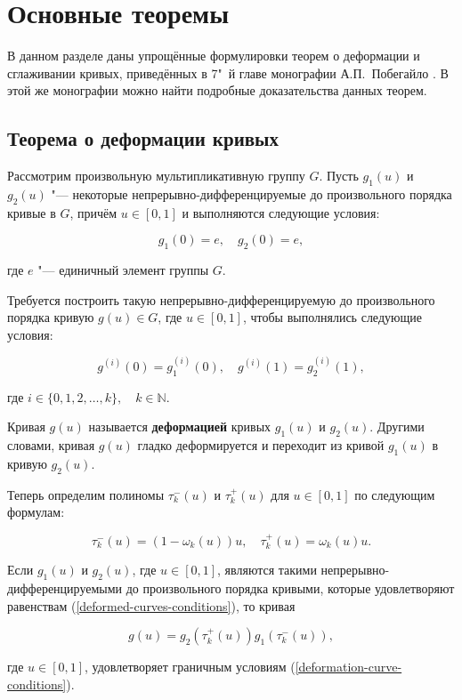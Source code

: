 \section{Основные теоремы}

В данном разделе даны упрощённые формулировки теорем о деформации и сглаживании кривых, приведённых в 7"~й главе
монографии А.П.~Побегайло \cite{pobegaylo}. В этой же монографии можно найти подробные доказательства данных теорем.

\subsection*{Теорема о деформации кривых}

Рассмотрим произвольную мультипликативную группу $G$. Пусть $g_1(u)$ и $g_2(u)$ "--- некоторые
непрерывно-дифференцируемые до произвольного порядка кривые в $G$, причём $u \in [0,1]$ и выполняются следующие условия:

\begin{equation}
g_1(0)=e, \quad g_2(0)=e,
\label{deformed-curves-conditions}
\end{equation}

\noindent где $e$ "--- единичный элемент группы $G$.

Требуется построить такую непрерывно-дифференцируемую до произвольного порядка кривую $g(u)\in G$, где $u \in [0,1]$,
чтобы выполнялись следующие условия:

\begin{equation}
g^{(i)}(0)=g_1^{(i)}(0), \quad g^{(i)}(1)=g_2^{(i)}(1),
\label{deformation-curve-conditions}
\end{equation}

\noindent где $i \in \{0,1,2,\dots,k\},\quad k\in\mathbb{N}$.

\begin{definition}
Кривая $g(u)$ называется \textbf{деформацией} кривых $g_1(u)$ и $g_2(u)$. Другими словами, кривая $g(u)$ гладко
деформируется и переходит из кривой $g_1(u)$ в кривую $g_2(u)$.
\end{definition}

Теперь определим полиномы $\tau_k^-(u)$ и $\tau_k^+(u)$ для $u \in [0,1]$ по следующим формулам:

$$
\tau_k^-(u)=(1-\omega_k(u))u, \quad \tau_k^+(u)=\omega_k(u)u.
$$

\begin{theorem}
Если $g_1(u)$ и $g_2(u)$, где $u \in [0,1]$, являются такими непрерывно-дифференцируемыми до произвольного порядка
кривыми, которые удовлетворяют равенствам (\ref{deformed-curves-conditions}), то кривая

$$
g(u)=g_2(\tau_k^+(u))g_1(\tau_k^-(u)),
$$

\noindent где $u \in [0,1]$, удовлетворяет граничным условиям (\ref{deformation-curve-conditions}).
\end{theorem}

